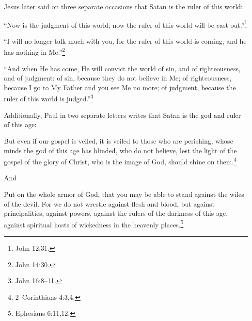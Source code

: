 \documentclass[letterpaper,12pt]{article}
\newenvironment{squote}
  {\small\quote}
  {\endquote\normalsize}
\begin{document}
Jesus later said on three separate occasions that Satan is the ruler of this world:

\begin{squote}
``Now is the judgment of this world; now the ruler of this world will be cast out.''\footnote{John 12:31.}
\end{squote}

\begin{squote}
``I will no longer talk much with you, for the ruler of this world is coming, and he has nothing in Me.''\footnote{John 14:30.}
\end{squote}

\begin{squote}
``And when He has come, He will convict the world of sin, and of righteousness, and of judgment: of sin, because they do not believe in Me; of righteousness, because I go to My Father and you see Me no more; of judgment, because the ruler of this world is judged.''\footnote{John 16:8--11.}
\end{squote}

Additionally, Paul in two separate letters writes that Satan is the god and ruler of this age:

\begin{squote}
But even if our gospel is veiled, it is veiled to those who are perishing, whose minds the god of this age has blinded, who do not believe, lest the light of the gospel of the glory of Christ, who is the image of God, should shine on them.\footnote{2~Corinthians 4:3,4.}
\end{squote}

And

\begin{squote}
Put on the whole armor of God, that you may be able to stand against the wiles of the devil. For we do not wrestle against flesh and blood, but against principalities, against powers, against the rulers of the darkness of this age, against spiritual hosts of wickedness in the heavenly places.\footnote{Ephesians 6:11,12.}
\end{squote}
\end{document}

